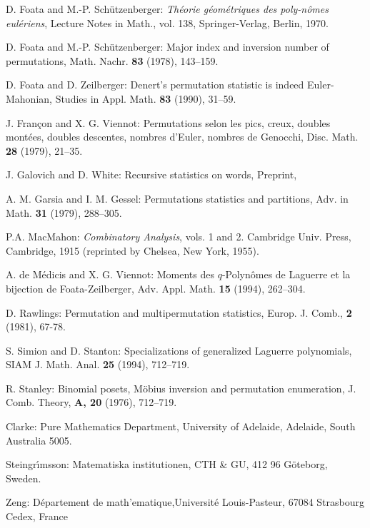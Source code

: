 \begin{thebibliography}{99}
 D. Foata and M.-P. Sch\"utzenberger: {\em Th\'eorie
g\'eom\'etriques des poly-n\^omes eul\'eriens},
Lecture Notes in Math., vol. 138, Springer-Verlag, Berlin, 1970.

 D. Foata and M.-P. Sch\"utzenberger: Major index and inversion
number of permutations, Math. Nachr. {\bf 83} (1978), 143--159.

 D. Foata and D. Zeilberger: Denert's permutation statistic is
indeed
Euler-Mahonian, Studies in Appl. Math. {\bf 83} (1990), 31--59.

 J. Fran\c con and X. G. Viennot: { Permutations selon
    les pics, creux, doubles mont\'ees, doubles descentes, nombres
    d'Euler, nombres de Genocchi}, Disc. Math. {\bf 28} (1979),
  21--35.

 J. Galovich and D. White:  Recursive statistics on
  words, Preprint,

 A. M. Garsia and I. M. Gessel: Permutations statistics and
partitions, Adv. in Math. {\bf 31} (1979), 288--305.


 P.A. MacMahon: {\em Combinatory Analysis}, vols. 1 and 2.
Cambridge Univ. Press, Cambridge, 1915 (reprinted by Chelsea, New York, 1955).

 A. de M\'edicis and X. G. Viennot: Moments des $q$-Polyn\^omes
de Laguerre et la bijection de Foata-Zeilberger, Adv. Appl. Math. {\bf 15}
(1994), 262--304.

 D. Rawlings: Permutation and multipermutation statistics, Europ.
J. Comb., {\bf 2} (1981), 67-78.

 S. Simion and D. Stanton: Specializations of generalized
Laguerre polynomials, SIAM J. Math. Anal. {\bf 25} (1994), 712--719.

 R. Stanley: Binomial posets, M\" {o}bius inversion
  and permutation enumeration, J. Comb. Theory, {\bf A, 20} (1976),
  712--719.
\end{thebibliography}

\bigskip

{\small

\noindent
Clarke: Pure Mathematics Department, University of Adelaide,
  Adelaide, South Australia 5005.

\noindent
Steingr\'{\i}msson: Matematiska institutionen, CTH \& GU, 412 96
G\"oteborg, Sweden.

\noindent
Zeng: D\'epartement de math\a'ematique,Universit\'e Louis-Pasteur,
67084 Strasbourg Cedex, France
}


